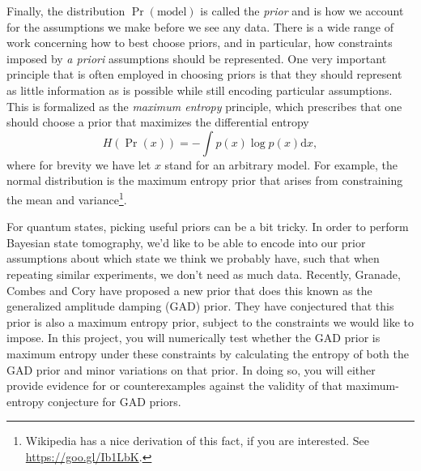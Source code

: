 \documentclass[aps,pra,onecolumn,nofootinbib,superscriptaddress,tightenlines,
notitlepage,12pt]{revtex4-1}
\begin{document}
Finally, the distribution $\Pr(\text{model})$ is called the \emph{prior} and
is how we account for the assumptions we make before we see any data. There is
a wide range of work concerning how to best choose priors, and in particular,
how constraints imposed by \emph{a priori} assumptions should be represented.
One very important principle that is often employed in choosing priors is that
they should represent as little information as is possible while still encoding
particular assumptions. This is formalized as the \emph{maximum entropy} principle,
which prescribes that one should choose a prior that maximizes the
differential entropy
\begin{equation}
    H(\Pr(x)) = -\int p(x) \log p(x) \mathrm{d}x,
\end{equation}
where for brevity we have let $x$ stand for an arbitrary model.
For example, the normal distribution is the maximum entropy prior that arises
from constraining the mean and variance\footnote{Wikipedia has a nice derivation
of this fact, if you are interested. See \url{https://goo.gl/Ib1LbK}.}.

For quantum states, picking useful priors can be a bit tricky. In order to
perform Bayesian state tomography, we'd like to be able to encode into our
prior assumptions about which state we think we probably have, such that when
repeating similar experiments, we don't need as much data. Recently, Granade,
Combes and Cory have proposed a new prior that does this known as the
generalized amplitude damping (GAD) prior. They have conjectured that this
prior is also a maximum entropy prior, subject to the constraints we would
like to impose. In this project, you will numerically test whether the GAD
prior is maximum entropy under these constraints by calculating the entropy of
both the GAD prior and minor variations on that prior. In doing so, you will
either provide evidence for or counterexamples against the validity of that
maximum-entropy conjecture for GAD priors.



\end{document}
